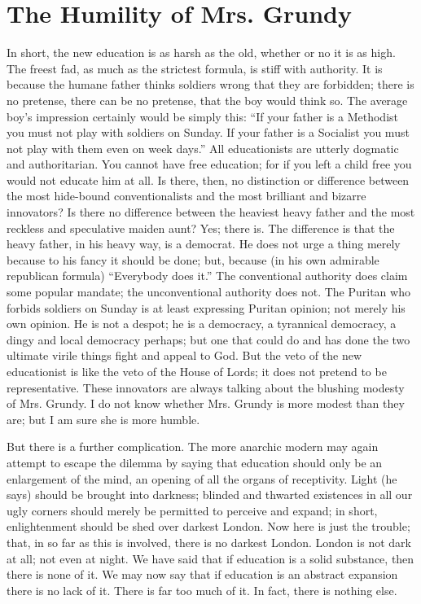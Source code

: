 \documentclass{book}
\begin{document}
\chapter{The Humility of Mrs. Grundy}
\label{chapter-38}
In short, the new education is as harsh as the old, whether or no it is as high. The freest fad, as much as the strictest formula, is stiff with authority. It is because the humane father thinks soldiers wrong that they are forbidden; there is no pretense, there can be no pretense, that the boy would think so. The average boy’s impression certainly would be simply this: “If your father is a Methodist you must not play with soldiers on Sunday. If your father is a Socialist you must not play with them even on week days.” All educationists are utterly dogmatic and authoritarian. You cannot have free education; for if you left a child free you would not educate him at all. Is there, then, no distinction or difference between the most hide-bound conventionalists and the most brilliant and bizarre innovators? Is there no difference between the heaviest heavy father and the most reckless and speculative maiden aunt? Yes; there is. The difference is that the heavy father, in his heavy way, is a democrat. He does not urge a thing merely because to his fancy it should be done; but, because (in his own admirable republican formula) “Everybody does it.” The conventional authority does claim some popular mandate; the unconventional authority does not. The Puritan who forbids soldiers on Sunday is at least expressing Puritan opinion; not merely his own opinion. He is not a despot; he is a democracy, a tyrannical democracy, a dingy and local democracy perhaps; but one that could do and has done the two ultimate virile things fight and appeal to God. But the veto of the new educationist is like the veto of the House of Lords; it does not pretend to be representative. These innovators are always talking about the blushing modesty of Mrs. Grundy. I do not know whether Mrs. Grundy is more modest than they are; but I am sure she is more humble.

But there is a further complication. The more anarchic modern may again attempt to escape the dilemma by saying that education should only be an enlargement of the mind, an opening of all the organs of receptivity. Light (he says) should be brought into darkness; blinded and thwarted existences in all our ugly corners should merely be permitted to perceive and expand; in short, enlightenment should be shed over darkest London. Now here is just the trouble; that, in so far as this is involved, there is no darkest London. London is not dark at all; not even at night. We have said that if education is a solid substance, then there is none of it. We may now say that if education is an abstract expansion there is no lack of it. There is far too much of it. In fact, there is nothing else.
\end{document}
